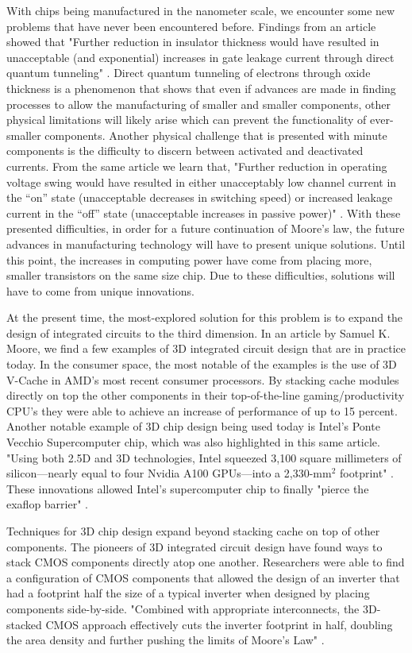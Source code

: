 \documentclass[12pt]{article}
\begin{document}
\begin{flushleft}
With chips being manufactured in the nanometer scale,
we encounter some new problems that have never been
encountered before. Findings from an article showed
that "Further reduction in insulator thickness would
have resulted in unacceptable (and exponential) increases
in gate leakage current through direct quantum tunneling"
\parencite{7878935}. Direct quantum tunneling of electrons
through oxide thickness is a phenomenon that shows
that even if advances are made in finding processes
to allow the manufacturing of smaller and smaller components,
other physical limitations will likely arise which
can prevent the functionality of ever-smaller components.
Another physical challenge that is presented with
minute components is the difficulty to discern between
activated and deactivated currents. From the same
article we learn that, "Further reduction in operating
voltage swing would have resulted in either unacceptably
low channel current in the “on” state (unacceptable
decreases in switching speed) or increased leakage
current in the “off” state (unacceptable increases
in passive power)" \parencite{7878935}. With these
presented difficulties, in order for a future continuation
of Moore's law, the future advances in manufacturing
technology will have to present unique solutions.
Until this point, the increases in computing power
have come from placing more, smaller transistors on
the same size chip. Due to these difficulties, solutions
will have to come from unique innovations.

At the present time, the most-explored solution for
this problem is to expand the design of integrated
circuits to the third dimension. In an article by Samuel
K. Moore, we find a few examples of 3D integrated circuit
design that are in practice today. In the consumer
space, the most notable of the examples is the use
of 3D V-Cache in AMD's most recent consumer processors.
By stacking cache modules directly on top the other
components in their top-of-the-line gaming/productivity
CPU's they were able to achieve an increase of performance
of up to 15 percent. Another notable example of 3D
chip design being used today is Intel's Ponte Vecchio
Supercomputer chip, which was also highlighted in
this same article. "Using both 2.5D and 3D technologies,
Intel squeezed 3,100 square millimeters of silicon—nearly
equal to four Nvidia A100 GPUs—into a 2,330-mm$^2$ footprint"
\parencite{9792148}. These innovations allowed Intel's
supercomputer chip to finally "pierce the exaflop barrier"
\parencite{9792148}.

Techniques for 3D chip design expand beyond stacking
cache on top of other components. The pioneers of 3D
integrated circuit design have found ways to stack
CMOS components directly atop one another. Researchers
were able to find a configuration of CMOS components
that allowed the design of an inverter that had a footprint
half the size of a typical inverter when designed by
placing components side-by-side. "Combined with appropriate
interconnects, the 3D-stacked CMOS approach effectively
cuts the inverter footprint in half, doubling the
area density and further pushing the limits of Moore's
Law" \parencite{9976473}.


\end{flushleft}
\end{document}
